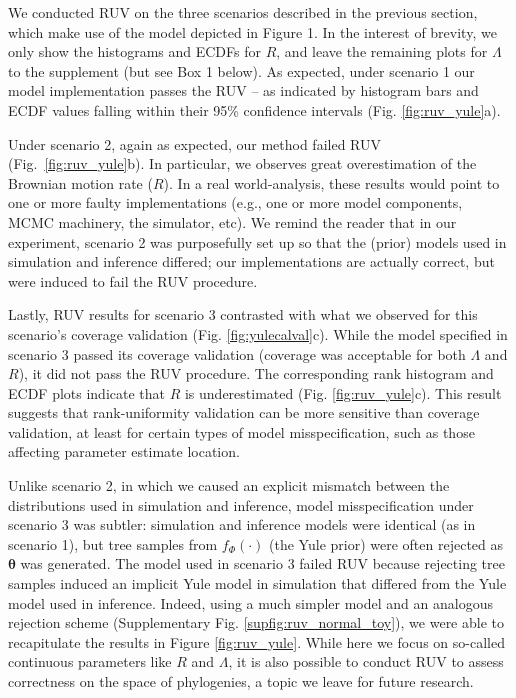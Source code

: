 \documentclass[oneside]{article}
\begin{document}
We conducted RUV on the three scenarios described in the previous section, which make use of the model depicted in Figure 1.
In the interest of brevity, we only show the histograms and ECDFs for $R$, and leave the remaining plots for $\Lambda$ to the supplement (but see Box 1 below).
As expected, under scenario 1 our model implementation passes the RUV -- as indicated by histogram bars and ECDF values falling within their 95\% confidence intervals (Fig. \ref{fig:ruv_yule}a).

Under scenario 2, again as expected, our method failed RUV (Fig.~\ref{fig:ruv_yule}b).
In particular, we observes great overestimation of the Brownian motion rate ($R$).
In a real world-analysis, these results would point to one or more faulty implementations (e.g., one or more model components, MCMC machinery, the simulator, etc).
We remind the reader that in our experiment, scenario 2 was purposefully set up so that the (prior) models used in simulation and inference differed; our implementations are actually correct, but were induced to fail the RUV procedure.

Lastly, RUV results for scenario 3 contrasted with what we observed for this scenario's coverage validation (Fig. \ref{fig:yulecalval}c).
While the model specified in scenario 3 passed its coverage validation (coverage was acceptable for both $\Lambda$ and $R$), it did not pass the RUV procedure.
The corresponding rank histogram and ECDF plots indicate that $R$ is underestimated (Fig. \ref{fig:ruv_yule}c).
This result suggests that rank-uniformity validation can be more sensitive than coverage validation, at least for certain types of model misspecification, such as those affecting parameter estimate location.

Unlike scenario 2, in which we caused an explicit mismatch between the distributions used in simulation and inference, model misspecification under scenario 3 was subtler: simulation and inference models were identical (as in scenario 1), but tree samples from $f_\Phi(\cdot)$ (the Yule prior) were often rejected as $\boldsymbol{\theta}$ was generated.
The model used in scenario 3 failed RUV because rejecting tree samples induced an implicit Yule model in simulation that differed from the Yule model used in inference. 
Indeed, using a much simpler model and an analogous rejection scheme (Supplementary Fig. \ref{supfig:ruv_normal_toy}), we were able to recapitulate the results in Figure \ref{fig:ruv_yule}.
While here we focus on so-called continuous parameters like $R$ and $\Lambda$, it is also possible to conduct RUV to assess correctness on the space of phylogenies, a topic we leave for future research.
\end{document}
